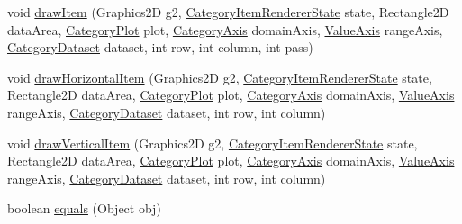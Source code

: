 \begin{DoxyCompactItemize}
\item 
void \mbox{\hyperlink{classorg_1_1jfree_1_1chart_1_1renderer_1_1category_1_1_box_and_whisker_renderer_a61909a834adad43a66613a795302395d}{draw\+Item}} (Graphics2D g2, \mbox{\hyperlink{classorg_1_1jfree_1_1chart_1_1renderer_1_1category_1_1_category_item_renderer_state}{Category\+Item\+Renderer\+State}} state, Rectangle2D data\+Area, \mbox{\hyperlink{classorg_1_1jfree_1_1chart_1_1plot_1_1_category_plot}{Category\+Plot}} plot, \mbox{\hyperlink{classorg_1_1jfree_1_1chart_1_1axis_1_1_category_axis}{Category\+Axis}} domain\+Axis, \mbox{\hyperlink{classorg_1_1jfree_1_1chart_1_1axis_1_1_value_axis}{Value\+Axis}} range\+Axis, \mbox{\hyperlink{interfaceorg_1_1jfree_1_1data_1_1category_1_1_category_dataset}{Category\+Dataset}} dataset, int row, int column, int pass)
\item 
void \mbox{\hyperlink{classorg_1_1jfree_1_1chart_1_1renderer_1_1category_1_1_box_and_whisker_renderer_aaeb4e1297257467659547402f45c03e6}{draw\+Horizontal\+Item}} (Graphics2D g2, \mbox{\hyperlink{classorg_1_1jfree_1_1chart_1_1renderer_1_1category_1_1_category_item_renderer_state}{Category\+Item\+Renderer\+State}} state, Rectangle2D data\+Area, \mbox{\hyperlink{classorg_1_1jfree_1_1chart_1_1plot_1_1_category_plot}{Category\+Plot}} plot, \mbox{\hyperlink{classorg_1_1jfree_1_1chart_1_1axis_1_1_category_axis}{Category\+Axis}} domain\+Axis, \mbox{\hyperlink{classorg_1_1jfree_1_1chart_1_1axis_1_1_value_axis}{Value\+Axis}} range\+Axis, \mbox{\hyperlink{interfaceorg_1_1jfree_1_1data_1_1category_1_1_category_dataset}{Category\+Dataset}} dataset, int row, int column)
\item 
void \mbox{\hyperlink{classorg_1_1jfree_1_1chart_1_1renderer_1_1category_1_1_box_and_whisker_renderer_ac1552e1d8c2131c2204422da8d11b357}{draw\+Vertical\+Item}} (Graphics2D g2, \mbox{\hyperlink{classorg_1_1jfree_1_1chart_1_1renderer_1_1category_1_1_category_item_renderer_state}{Category\+Item\+Renderer\+State}} state, Rectangle2D data\+Area, \mbox{\hyperlink{classorg_1_1jfree_1_1chart_1_1plot_1_1_category_plot}{Category\+Plot}} plot, \mbox{\hyperlink{classorg_1_1jfree_1_1chart_1_1axis_1_1_category_axis}{Category\+Axis}} domain\+Axis, \mbox{\hyperlink{classorg_1_1jfree_1_1chart_1_1axis_1_1_value_axis}{Value\+Axis}} range\+Axis, \mbox{\hyperlink{interfaceorg_1_1jfree_1_1data_1_1category_1_1_category_dataset}{Category\+Dataset}} dataset, int row, int column)
\item 
boolean \mbox{\hyperlink{classorg_1_1jfree_1_1chart_1_1renderer_1_1category_1_1_box_and_whisker_renderer_a01f5d5eed50c880151529fe0c2b1744d}{equals}} (Object obj)
\end{DoxyCompactItemize}
